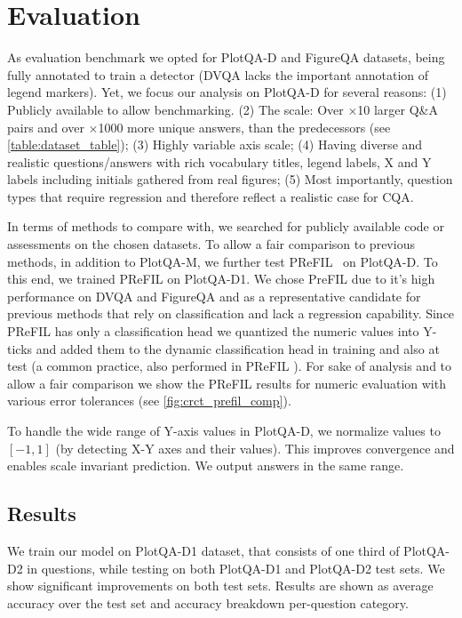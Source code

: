 \documentclass[runningheads]{llncs}
\begin{document}
\section{Evaluation}
\label{sec:Evaluation}
As evaluation benchmark we opted for PlotQA-D and FigureQA datasets, being fully annotated to train a detector (DVQA lacks the important annotation of legend markers). Yet, we focus our analysis on PlotQA-D for several reasons: (1) Publicly available to allow benchmarking. (2) The scale: Over $\times$10 larger Q\&A pairs and over $\times$1000 more unique answers, than the predecessors (see \cref{table:dataset_table}); (3) Highly variable axis scale; (4) Having diverse and realistic questions/answers with rich vocabulary titles, legend labels, X and Y labels including initials gathered from real figures; (5) Most importantly, question types that require regression and therefore reflect a realistic case for CQA.

In terms of methods to compare with, we searched for publicly available code or assessments on the chosen datasets. 
To allow a fair comparison to previous methods, in addition to PlotQA-M,  we further test PReFIL~\cite{prefil} on PlotQA-D. To this end, we trained PReFIL on PlotQA-D1. We chose PreFIL due to it's high performance on DVQA and FigureQA and as a representative candidate for previous methods that rely on classification and lack a regression capability. Since PReFIL has only a classification head we quantized the numeric values into Y-ticks and added them to the dynamic classification head in training and also at test (a common practice, also performed in PReFIL \cite{prefil}). For sake of analysis and to allow a fair comparison we show the PReFIL results for numeric evaluation with various error tolerances (see \cref{fig:crct_prefil_comp}).


To handle the wide range of Y-axis values in PlotQA-D, we normalize values to $[-1, 1]$ (by detecting X-Y axes and their values). This improves convergence and enables scale invariant prediction. We output answers in the same range. 
\subsection{Results}We train our model on PlotQA-D1 dataset, that consists of one third of PlotQA-D2 in questions, while testing on both PlotQA-D1 and PlotQA-D2 test sets. We show significant improvements on both test sets. Results are shown as average accuracy over the test set and accuracy breakdown per-question category.
\end{document}
